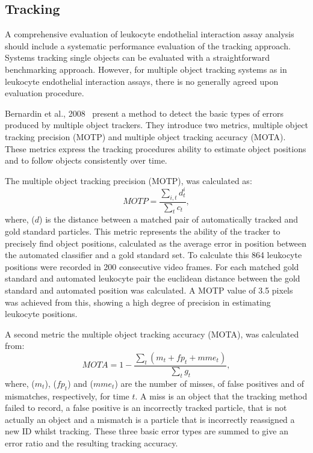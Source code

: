 \subsection{Tracking}
\label{leukocytes:validation:tracking}
A comprehensive evaluation of leukocyte endothelial interaction assay analysis should include a systematic performance evaluation of the tracking approach. Systems tracking single objects can be evaluated with a straightforward benchmarking approach. However, for multiple object tracking systems as in leukocyte endothelial interaction assays, there is no generally agreed upon evaluation procedure.

Bernardin et al., 2008~\cite{Bernardin2008} present a method to detect the basic types of errors produced by multiple object trackers. They introduce two metrics, multiple object tracking precision (MOTP) and multiple object tracking accuracy (MOTA). These metrics express the tracking procedures ability to estimate object positions and to follow objects consistently over time.

The multiple object tracking precision (MOTP), was calculated as:
\begin{equation}
	MOTP=\frac{\sum_{i,t}d_{t}^{i}}{\sum_{t}c_{t}},
\end{equation}
where, ($d$) is the distance between a matched pair of automatically tracked and gold standard particles. This metric represents the ability of the tracker to precisely find object positions, calculated as the average error in position between the automated classifier and a gold standard set. To calculate this 864 leukocyte positions were recorded in 200 consecutive video frames. For each matched gold standard and automated leukocyte pair the euclidean distance between the gold standard and automated position was calculated. A MOTP value of 3.5 pixels was achieved from this, showing a high degree of precision in estimating leukocyte positions.

A second metric the multiple object tracking accuracy (MOTA), was calculated from:
\begin{equation}
	MOTA=1-\frac{\sum_{t}(m_t+fp_t+mme_t)}{\sum_{t}g_{t}},
\end{equation}
where, ($m_t$), ($fp_t$) and ($mme_t$) are the number of misses, of false positives and of mismatches, respectively, for time $t$. A miss is an object that the tracking method failed to record, a false positive is an incorrectly tracked particle, that is not actually an object and a mismatch is a particle that is incorrectly reassigned a new ID whilst tracking. These three basic error types are summed to give an error ratio and the resulting tracking accuracy.

